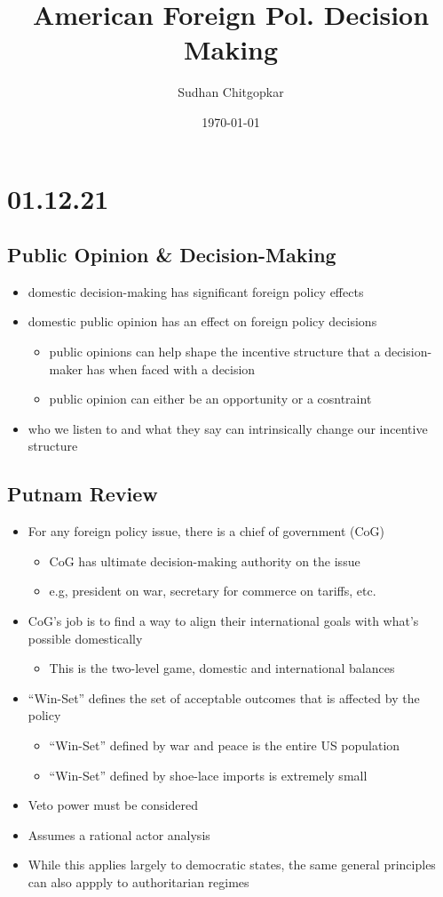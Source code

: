 \documentclass[11pt]{article}
\author{Sudhan Chitgopkar}
\date{\today}
\title{American Foreign Pol. Decision Making}
\begin{document}
\maketitle
\tableofcontents \clearpage\section{01.12.21}
\label{sec:org6f2b152}
\subsection{Public Opinion \& Decision-Making}
\label{sec:org5890f10}
\begin{itemize}
\item domestic decision-making has significant foreign policy effects
\item domestic public opinion has an effect on foreign policy decisions
\begin{itemize}
\item public opinions can help shape the incentive structure that a decision-maker has when faced with a decision
\item public opinion can either be an opportunity or a cosntraint
\end{itemize}
\item who we listen to and what they say can intrinsically change our incentive structure
\end{itemize}
\subsection{Putnam Review}
\label{sec:org5e1a6ae}
\begin{itemize}
\item For any foreign policy issue, there is a chief of government (CoG)
\begin{itemize}
\item CoG has ultimate decision-making authority on the issue
\item e.g, president on war, secretary for commerce on tariffs, etc.
\end{itemize}
\item CoG's job is to find a way to align their international goals with what's possible domestically
\begin{itemize}
\item This is the two-level game, domestic and international balances
\end{itemize}
\item ``Win-Set'' defines the set of acceptable outcomes that is affected by the policy
\begin{itemize}
\item ``Win-Set'' defined by war and peace is the entire US population
\item ``Win-Set'' defined by shoe-lace imports is extremely small
\end{itemize}
\item Veto power must be considered
\item Assumes a rational actor analysis
\item While this applies largely to democratic states, the same general principles can also appply to authoritarian regimes
\end{itemize}
\end{document}
